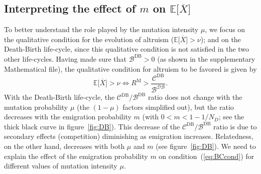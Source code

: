 \documentclass[11pt, letterpaper]{article}
\newcommand{\eqrefnoeq}[1]{(\ref{#1})}
\newcommand{\Esp}[1]{\mathbb{E}\big[ #1\big]}%
\newcommand{\Moran}{\textrm{M}}
\newcommand{\DB}{\textrm{DB}}
\newcommand{\mutbias}{\nu}
\newcommand{\ndemes}{N_D}
\begin{document}
\subsection*{Interpreting the effect of $m$ on $\Esp{\overline{X}}$}

To better understand the role played by the mutation intensity $\mu$, we focus on the qualitative condition for the evolution of altruism ($\Esp{\overline{X}} > \mutbias$); and on the Death-Birth life-cycle, since this qualitative condition is not satisfied in the two other life-cycles. %
Having made sure that $\mathcal{B}^{\DB}>0$ (as shown in the supplementary Mathematical file), the qualitative condition for altruism to be favored is given by 
\begin{equation}\label{eq:BCcond}
\Esp{\overline{X}} > \mutbias \Leftrightarrow R^{\Moran} > \frac{\mathcal{C}^{\DB}}{\mathcal{B^{\DB}}}.
\end{equation}
%
With the Death-Birth life-cycle, the $\mathcal{C}^{\DB}/\mathcal{B}^{\DB}$ ratio does not change with the mutation probability $\mu$ (the $(1-\mu)$ factors simplified out), but the ratio decreases with the emigration probability $m$ (with $0<m<1-1/\ndemes$; see the thick black curve in figure~\ref{fig:DB}). This decrease of the $\mathcal{C}^{\DB}/\mathcal{B}^{\DB}$ ratio is due to secondary effects (competition) diminishing as emigration increases. Relatedness, on the other hand, decreases with both $\mu$ and $m$ (see figure~\ref{fig:DB}). We need to explain the effect of the emigration probability $m$ on condition~\eqrefnoeq{eq:BCcond} for different values of mutation intensity $\mu$. 
\end{document}
